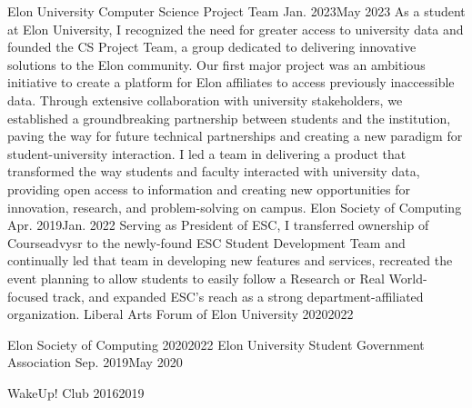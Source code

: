 \documentclass{listofpersonalprofessionalachievements}
\begin{document}
\begin{itemize}
    {Elon University Computer Science Project Team}
    {Jan. 2023}{May 2023}
    {As a student at Elon University, I recognized the need for greater access to university data and founded the CS Project Team, a group dedicated to delivering innovative solutions to the Elon community. Our first major project was an ambitious initiative to create a platform for Elon affiliates to access previously inaccessible data. Through extensive collaboration with university stakeholders, we established a groundbreaking partnership between students and the institution, paving the way for future technical partnerships and creating a new paradigm for student-university interaction. I led a team in delivering a product that transformed the way students and faculty interacted with university data, providing open access to information and creating new opportunities for innovation, research, and problem-solving on campus.
    }
    {Elon Society of Computing}
    {Apr. 2019}{Jan. 2022}
    {Serving as President of ESC, I transferred ownership of Courseadvysr to the newly-found ESC Student Development Team and continually led that team in developing new features and services, recreated the event planning to allow students to easily follow a Research or Real World-focused track, and expanded ESC's reach as a strong department-affiliated organization.
    }
    {Liberal Arts Forum of Elon University}
    {2020}{2022}
    {}

    {Elon Society of Computing}
    {2020}{2022}
    {}
    {Elon University Student Government Association}
    {Sep. 2019}{May 2020}
    {
        \begin{itemize}
        \end{itemize}
    }

    {WakeUp! Club}
    {2016}{2019}
    {
        \begin{itemize}
        \end{itemize}
    }


\end{itemize}
\end{document}
